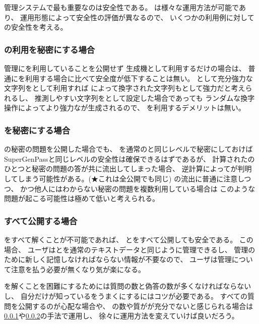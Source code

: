 \documentclass[twoside]{wiss}
\begin{document}
{\PW}管理システムで最も重要なのは安全性である。
%
{\EP}は様々な運用方法が可能であり、
運用形態によって安全性の評価が異なるので、
いくつかの利用例に対して{\EP}の安全性を考える。

\subsubsection{\protect{\textsf{\EP}}の利用を秘密にする場合}
\label{pattern1}

{\PW}管理に{\EP}を利用していることを公開せず
{\PW}生成機として利用するだけの場合は、
普通に{\PW}を利用する場合に比べて安全度が低下することは無い。
{\PW}として充分強力な文字列を{\SS}として利用すれば
{\EP}によって換字された文字列も{\PW}として強力だと考えられるし、
推測しやすい文字列を{\SS}として設定した場合であっても
ランダムな換字操作によってより強力な{\PW}が生成されるので、
{\EP}を利用するデメリットは無い。

\subsubsection{{\SS}を秘密にする場合}
\label{pattern2}

{\EP}の秘密の問題を公開した場合でも、
{\SS}を通常の{\PW}と同じレベルで秘密にしておけば
SuperGenPass\cite{SuperGenPass}と同じレベルの安全性は確保できるはずであるが、
計算された{\PW}のひとつと秘密の問題の答が共に流出してしまった場合、
逆計算によって{\SS}が判明してしまう可能性がある。(★これは全公開でも同じ)
{\PW}の流出に普通に注意しつつ、
かつ他人にはわからない秘密の問題を複数利用している場合は
このような問題が起こる可能性は極めて低いと考えられる。


\subsubsection{すべて公開する場合}

{\SQ}をすべて解くことが不可能であれば、
{\SS}と{\SQ}をすべて公開しても安全である。
この場合、
ユーザは{\SQ}と{\SS}を通常のテキストデータと同じように管理できるし、
{\PW}管理のために新しく記憶しなければならない情報が不要なので、
ユーザは{\PW}管理について注意を払う必要が無くなり気が楽になる。

{\SQ}を解くことを困難にするためには質問の数と偽答の数が多くなければならないし、
自分だけが知っている{\EM}をうまく{\SQ}にするにはコツが必要である。
すべての質問を公開するのが心配な場合や、
{\SQ}の数や質がが充分でないと感じられる場合は
\ref{pattern1}や\ref{pattern2}の手法で運用し、
徐々に運用方法を変えていけば良いだろう。
\end{document}
